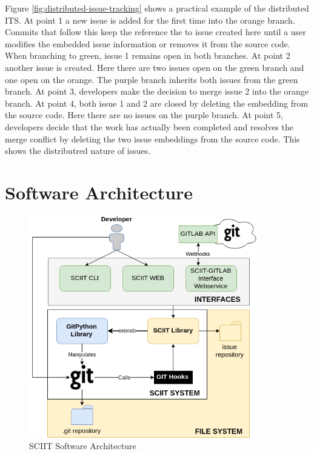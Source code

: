 \documentclass{mproj}
\begin{document}
Figure \ref{fig:distributed-issue-tracking} shows a practical example of the distributed ITS. At point 1 a new issue is added for the first time into the orange branch. Commits that follow this keep the reference the to issue created here until a user modifies the embedded issue information or removes it from the source code. When branching to green, issue 1 remains open in both branches. At point 2 another issue is created. Here there are two issues open on the green branch and one open on the orange. The purple branch inherits both issues from the green branch. At point 3, developers make the decision to merge issue 2 into the orange branch. At point 4, both issue 1 and 2 are closed by deleting the embedding from the source code. Here there are no issues on the purple branch. At point 5, developers decide that the work has actually been completed and resolves the merge conflict by deleting the two issue embeddings from the source code. This shows the distributred nature of issues.







\section{Software Architecture}

\begin{figure}[h!]
\caption{SCIIT Software Architecture}
\label{fig:sciit-software-arch}
\centering
\includegraphics[width=10cm]{sciit-software-arch}
\end{figure}
\end{document}
